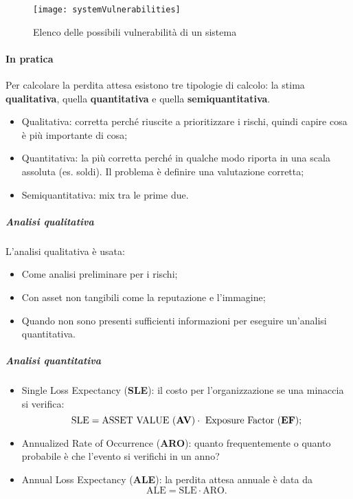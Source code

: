\begin{figure}[t]
 \centering
 \texttt{[image: systemVulnerabilities]}
 \caption[Vulnerabilità di un sistema]{Elenco delle possibili vulnerabilità di
un sistema}
 \label{img:vulnriskmng}
\end{figure}


\paragraph*{In pratica}

Per calcolare la perdita attesa esistono tre tipologie di calcolo: la stima
\textbf{qualitativa}, quella \textbf{quantitativa} e quella
\textbf{semiquantitativa}.

\begin{itemize}
\item Qualitativa: corretta perché riuscite a prioritizzare i rischi, quindi
capire cosa è più importante di cosa;
\item Quantitativa: la più corretta perché in qualche modo riporta in una scala
assoluta (es. soldi). Il problema è definire una valutazione corretta;
\item Semiquantitativa: mix tra le prime due.
\end{itemize}

\subparagraph*{Analisi qualitativa}

L'analisi qualitativa è usata:
\begin{itemize}
\item Come analisi preliminare per i rischi;
\item Con asset non tangibili come la reputazione e l'immagine;
\item Quando non sono presenti sufficienti informazioni per eseguire
un'analisi quantitativa.
\end{itemize}

\subparagraph*{Analisi quantitativa}

\begin{itemize}
\item Single Loss Expectancy (\textbf{SLE}): il costo per l'organizzazione se
una minaccia si verifica:
$$
\text{SLE} = \text{ASSET VALUE (\textbf{AV})} \cdot \text{ Exposure Factor
(\textbf{EF})};
$$
\item Annualized Rate of Occurrence (\textbf{ARO}): quanto frequentemente o
quanto probabile è che l'evento si verifichi in un anno?
\item Annual Loss Expectancy (\textbf{ALE}): la perdita attesa annuale è data
da
$$
\text{ALE} = \text{SLE} \cdot \text{ARO}.
$$
\end{itemize}


